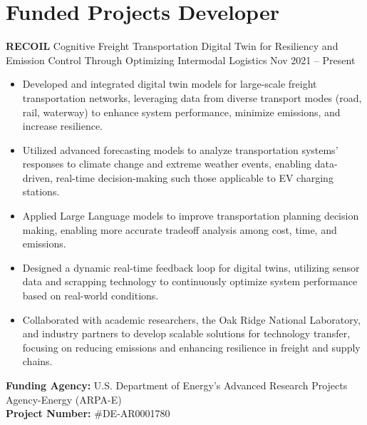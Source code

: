 \documentclass[10pt, letterpaper]{article}
\newenvironment{highlights}{
    \begin{itemize}[
        topsep=0.10 cm,
        parsep=0.10 cm,
        partopsep=0pt,
        itemsep=0pt,
        leftmargin=0 cm + 10pt
    ]
}{
    \end{itemize}
} %
\newenvironment{twocolentry}[2][]{
    \onecolentry
    \def\secondColumn{#2}
    \setcolumnwidth{\fill, 4.5 cm}
    \begin{paracol}{2}
}{
    \switchcolumn \raggedleft \secondColumn
    \end{paracol}
    \endonecolentry
} %
\begin{document}
\section*{Funded Projects Developer}
\small
\begin{twocolentry}{Nov 2021 – Present} \textbf{RECOIL} \textbar Cognitive Freight Transportation Digital Twin for Resiliency and Emission Control Through Optimizing Intermodal Logistics \end{twocolentry} \begin{highlights} \item Developed and integrated digital twin models for large-scale freight transportation networks, leveraging data from diverse transport modes (road, rail, waterway) to enhance system performance, minimize emissions, and increase resilience. 
    \item Utilized advanced forecasting models to analyze transportation systems' responses to climate change and extreme weather events, enabling data-driven, real-time decision-making such those applicable to EV charging stations. 
    \item Applied Large Language models to improve transportation planning decision making, enabling more accurate tradeoff analysis among cost, time, and emissions. 
    \item Designed a dynamic real-time feedback loop for digital twins, utilizing sensor data and scrapping technology to continuously optimize system performance based on real-world conditions.
     \item Collaborated with academic researchers, the Oak Ridge National Laboratory, and industry partners to develop scalable solutions for technology transfer, focusing on reducing emissions and enhancing resilience in freight and supply chains. \\
    \end{highlights} \vspace{0.3cm} \noindent \textbf{Funding Agency:} U.S. Department of Energy’s Advanced Research Projects Agency-Energy (ARPA-E)\\  \textbf{Project Number:} \#DE-AR0001780
\end{document}
